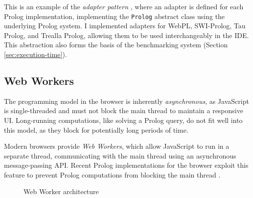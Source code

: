 This is an example of the \emph{adapter pattern} \cite{gammaDesignPatternsElements1995}, where an adapter is defined for each Prolog implementation, implementing the \texttt{Prolog} abstract class using the underlying Prolog system. I implemented adapters for WebPL, SWI-Prolog, Tau Prolog, and Trealla Prolog, allowing them to be used interchangeably in the IDE. This abstraction also forms the basis of the benchmarking system (Section \ref{sec:execution-time}).

\subsection{Web Workers}

The programming model in the browser is inherently \emph{asynchronous}, as JavaScript is single-threaded and must not block the main thread to maintain a responsive UI. Long-running computations, like solving a Prolog query, do not fit well into this model, as they block for potentially long periods of time.

Modern browsers provide \emph{Web Workers}, which allow JavaScript to run in a separate thread, communicating with the main thread using an asynchronous message-passing API. Recent Prolog implementations for the browser exploit this feature to prevent Prolog computations from blocking the main thread \cite{garcia-pradalessCASPInBrowserPlayground2022, riazaTauPrologProlog2024}.

\begin{figure}[H]
\centering
{}
\caption{Web Worker architecture}
\label{fig:web-worker-arch}
\end{figure}

